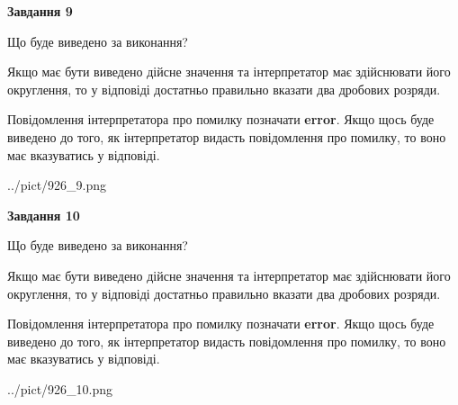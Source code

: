 \documentclass[12pt, ukrainian]{article}
\begin{document}
{\begin {Large}
{\begin {center}\textbf{Завдання 9}\end {center}}\par
Що буде виведено за виконання? \par

Якщо має бути виведено дійсне значення та інтерпретатор має здійснювати його округлення, 
то у відповіді достатньо правильно вказати два дробових розряди.

Повідомлення інтерпретатора про помилку позначати \textbf{error}.
Якщо щось буде виведено до того, як інтерпретатор видасть повідомлення про помилку, 
то воно має вказуватись у відповіді. \par

\begin{center}
	{../pict/926_9.png}
\end{center}
\newpage

{\begin {center}\textbf{Завдання 10}\end {center}}\par
Що буде виведено за виконання? \par

Якщо має бути виведено дійсне значення та інтерпретатор має здійснювати його округлення, 
то у відповіді достатньо правильно вказати два дробових розряди.

Повідомлення інтерпретатора про помилку позначати \textbf{error}.
Якщо щось буде виведено до того, як інтерпретатор видасть повідомлення про помилку, 
то воно має вказуватись у відповіді. \par

\begin{center}
	{../pict/926_10.png}
\end{center}
\newpage

\end {Large}}
\end{document}

